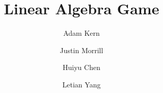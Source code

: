 
\newtheorem{theorem}{Theorem}
\newtheorem{proposition}[theorem]{Proposition}
\newtheorem{lemma}[theorem]{Lemma}
\newtheorem{corollary}[theorem]{Corollary}

\theoremstyle{definition}
\newtheorem{definition}[theorem]{Definition}

\title{Linear Algebra Game}
\author{Adam Kern \and Justin Morrill \and Huiyu Chen \and Letian Yang}

\newcommand{\lean}[1]{}
\newcommand{\discussion}[1]{}
\newcommand{\leanok}{}
\newcommand{\mathlibok}{}
\newcommand{\notready}{}
\newcommand{\uses}{}

\maketitle


